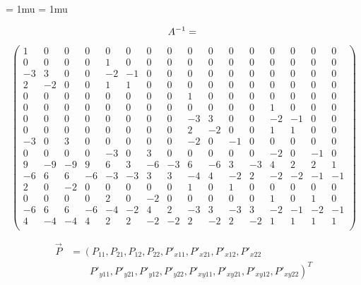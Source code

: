 \documentclass{IEEEtran}
\begin{document}
\begin{frame}
\footnotesize
\arraycolsep=1pt %
\medmuskip = 1mu %
\thickmuskip = 1mu

\begin{equation*}
A^{-1}  =\\
\end{equation*}
\begin{equation}
\begin{pmatrix}
1 & 0 & 0 & 0 & 0 & 0 & 0 & 0 & 0 & 0 & 0 & 0 & 0 & 0 & 0 & 0 \\
0 & 0 & 0 & 0 & 1 & 0 & 0 & 0 & 0 & 0 & 0 & 0 & 0 & 0 & 0 & 0 \\
-3 & 3 & 0 & 0 & -2 & -1 & 0 & 0 & 0 & 0 & 0 & 0 & 0 & 0 & 0 & 0\\
2 & -2 & 0 & 0 & 1 & 1 & 0 & 0 & 0 & 0 & 0 & 0 & 0 & 0 & 0 & 0\\
0 & 0 & 0 & 0 & 0 & 0 & 0 & 0 & 1 & 0 & 0 & 0 & 0 & 0 & 0 & 0\\
0 & 0 & 0 & 0 & 0 & 0 & 0 & 0 & 0 & 0 & 0 & 0 & 1 & 0 & 0 & 0\\
0 & 0 & 0 & 0 & 0 & 0 & 0 & 0 & -3 & 3 & 0 & 0 & -2 & -1 & 0 & 0\\
0 & 0 & 0 & 0 & 0 & 0 & 0 & 0 & 2 & -2 & 0 & 0 & 1 & 1 & 0 & 0\\
-3 & 0 & 3 & 0 & 0 & 0 & 0 & 0 & -2 & 0 & -1 & 0 & 0 & 0 & 0 & 0\\
0 & 0 & 0 & 0 & -3 & 0 & 3 & 0 & 0 & 0 & 0 & 0 & -2 & 0 & -1 & 0\\
9 & -9 & -9 & 9 & 6 & 3 & -6 & -3 & 6 & -6 & 3 & -3 & 4 & 2 & 2 & 1\\
-6 & 6 & 6 & -6 & -3 & -3 & 3 & 3 & -4 & 4 & -2 & 2 & -2 & -2 & -1 & -1\\
2 & 0 & -2 & 0 & 0 & 0 & 0 & 0 & 1 & 0 & 1 & 0 & 0 & 0 & 0 & 0\\
0 & 0 & 0 & 0 & 2 & 0 & -2 & 0 & 0 & 0 & 0 & 0 & 1 & 0 & 1 & 0\\
-6 & 6 & 6 & -6 & -4 & -2 & 4 & 2 & -3 & 3 & -3 & 3 & -2 & -1 & -2 & -1\\
4 & -4 & -4 & 4 & 2 & 2 & -2 & -2 & 2 & -2 & 2 & -2 & 1 & 1 & 1 & 1\\
 \end{pmatrix}
\end{equation}
\end{frame}

\begin{align}
\vec{P}&=\left(P_{11},P_{21},P_{12},P_{22},P'_{x11},P'_{x21},P'_{x12},P'_{x22}\right.\nonumber\\
  &\qquad \left. P'_{y11},P'_{y21},P'_{y12},P'_{y22},P'_{xy11},P'_{xy21},P'_{xy12},P'_{xy22}\right)^{T}
\end{align} 
\end{document}
